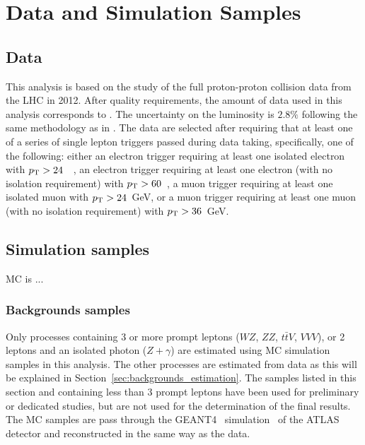 \section{Data and Simulation Samples}
\subsection{Data}
\label{sec:subsection_data}



This analysis is based on the study of the full proton-proton collision
data from the LHC in 2012. After quality requirements, the amount 
of data used in this analysis corresponds to \lumi.
The uncertainty on the luminosity is $2.8\%$ 
following the same methodology as in \cite{Aad:2013ucp}.
The data are selected after requiring that at least one
of a series of single lepton triggers passed during data taking, 
specifically, one of the following:
either an electron trigger 
requiring at least one isolated
electron with $p_{\mathrm{T}}>24$~\GeV~, an electron trigger requiring
at least one electron 
(with no isolation requirement) with $p_{\mathrm{T}}>60$~\GeV, a muon 
trigger requiring at least one isolated muon with $p_{\mathrm{T}}>24$~GeV,
or a muon trigger requiring at least one muon 
(with no isolation requirement) with $p_{\mathrm{T}}>36$~GeV.


\subsection{Simulation samples}
MC is ...


\subsubsection{Backgrounds samples}
\label{sec:subsection_datasets_MC}

Only processes containing 3 or more prompt
leptons ($WZ$, $ZZ$, $t\bar{t}V$, $VVV$), or 2 leptons and an 
isolated photon ($Z+\gamma$) are estimated using MC simulation 
samples in this analysis. The other processes are estimated from 
data as this will be explained in Section~\ref{sec:backgrounds_estimation}. 
The samples listed in this section and containing less than 3 prompt leptons 
have been used for preliminary or dedicated studies, but are not used for 
the determination of the final results. The MC samples are pass through the 
GEANT4~\cite{Agostinelli:2002hh} simulation~\cite{Aad:2010ah} of the ATLAS 
detector and reconstructed in the same way as the data.

